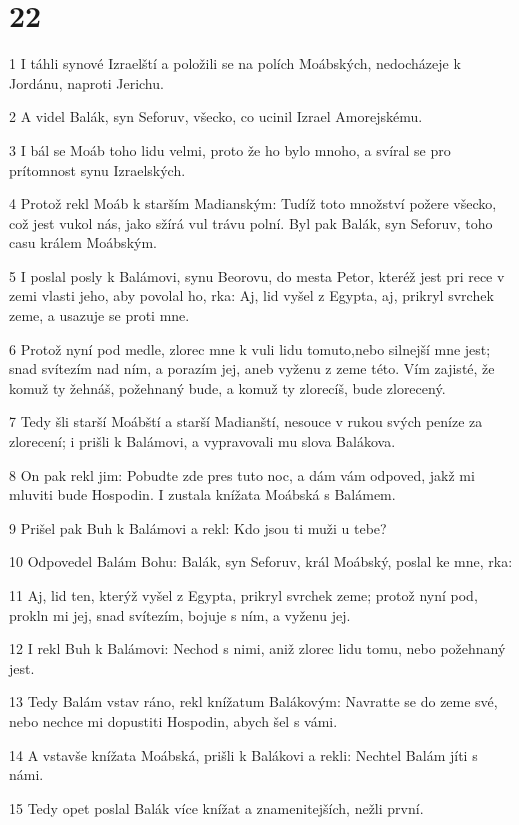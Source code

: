 \chapter{22}

\par 1 I táhli synové Izraelští a položili se na polích Moábských, nedocházeje k Jordánu, naproti Jerichu.
\par 2 A videl Balák, syn Seforuv, všecko, co ucinil Izrael Amorejskému.
\par 3 I bál se Moáb toho lidu velmi, proto že ho bylo mnoho, a svíral se pro prítomnost synu Izraelských.
\par 4 Protož rekl Moáb k starším Madianským: Tudíž toto množství požere všecko, což jest vukol nás, jako sžírá vul trávu polní. Byl pak Balák, syn Seforuv, toho casu králem Moábským.
\par 5 I poslal posly k Balámovi, synu Beorovu, do mesta Petor, kteréž jest pri rece v zemi vlasti jeho, aby povolal ho, rka: Aj, lid vyšel z Egypta, aj, prikryl svrchek zeme, a usazuje se proti mne.
\par 6 Protož nyní pod medle, zlorec mne k vuli lidu tomuto,nebo silnejší mne jest; snad svítezím nad ním, a porazím jej, aneb vyženu z zeme této. Vím zajisté, že komuž ty žehnáš, požehnaný bude, a komuž ty zlorecíš, bude zlorecený.
\par 7 Tedy šli starší Moábští a starší Madianští, nesouce v rukou svých peníze za zlorecení; i prišli k Balámovi, a vypravovali mu slova Balákova.
\par 8 On pak rekl jim: Pobudte zde pres tuto noc, a dám vám odpoved, jakž mi mluviti bude Hospodin. I zustala knížata Moábská s Balámem.
\par 9 Prišel pak Buh k Balámovi a rekl: Kdo jsou ti muži u tebe?
\par 10 Odpovedel Balám Bohu: Balák, syn Seforuv, král Moábský, poslal ke mne, rka:
\par 11 Aj, lid ten, kterýž vyšel z Egypta, prikryl svrchek zeme; protož nyní pod, prokln mi jej, snad svítezím, bojuje s ním, a vyženu jej.
\par 12 I rekl Buh k Balámovi: Nechod s nimi, aniž zlorec lidu tomu, nebo požehnaný jest.
\par 13 Tedy Balám vstav ráno, rekl knížatum Balákovým: Navratte se do zeme své, nebo nechce mi dopustiti Hospodin, abych šel s vámi.
\par 14 A vstavše knížata Moábská, prišli k Balákovi a rekli: Nechtel Balám jíti s námi.
\par 15 Tedy opet poslal Balák více knížat a znamenitejších, nežli první.
